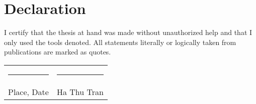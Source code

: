 
\chapter*{Declaration}

I certify that the thesis at hand was made without
unauthorized help and that I only used the tools denoted.
All statements literally or logically taken from publications
are marked as quotes.  

\vspace{2cm}

\noindent
\begin{tabular}{p{} l}
  \rule{\textwidth/3}{0.4pt}   &   \rule{\textwidth/3}{0.4pt} \\
  Place, Date                  &   Ha Thu Tran
\end{tabular}
